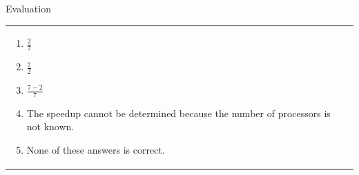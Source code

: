 \documentclass[final,t]{beamer}
\begin{document}
\begin{frame}[fragile]{}
\begin{columns}[t]
\begin{column}{.3\linewidth}
\begin{block}{Evaluation}
\begin{tabular}{p{10in}p{10in}}
\begin{enumerate}
                        \item $\frac{2}{7}$
                        \item $\frac{7}{2}$
                        \item $\frac{7-2}{7}$
                        \item The speedup cannot be determined because the number of processors is not known.
                        \item None of these answers is correct.
                \end{enumerate} \\
                \end{tabular}
                \vspace*{2.0in}
            \end{block}
        \end{column}
    \end{columns}
\end{frame}
\end{document}
